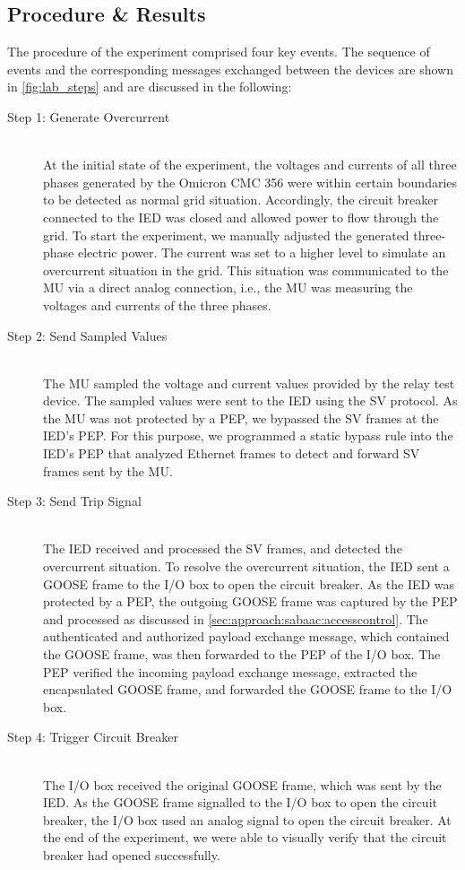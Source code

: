 \subsection{Procedure \& Results}
\label{sec:evaluation:compatibility:procedure}
The procedure of the experiment comprised four key events.
The sequence of events and the corresponding messages exchanged between the devices are shown in \autoref{fig:lab_steps} and are discussed in the following:
\begin{description}
    \item[Step 1: Generate Overcurrent]~\\
    At the initial state of the experiment, the voltages and currents of all three phases generated by the Omicron CMC 356 were within certain boundaries to be detected as normal grid situation.
    Accordingly, the circuit breaker connected to the IED was closed and allowed power to flow through the grid.
    To start the experiment, we manually adjusted the generated three-phase electric power.
    The current was set to a higher level to simulate an overcurrent situation in the grid.
    This situation was communicated to the MU via a direct analog connection, i.e., the MU was measuring the voltages and currents of the three phases.

    \item[Step 2: Send Sampled Values]~\\
    The MU sampled the voltage and current values provided by the relay test device.
    The sampled values were sent to the IED using the SV protocol.
    As the MU was not protected by a PEP, we bypassed the SV frames at the IED's PEP.
    For this purpose, we programmed a static bypass rule into the IED's PEP that analyzed Ethernet frames to detect and forward SV frames sent by the MU.

    \item[Step 3: Send Trip Signal]~\\
    The IED received and processed the SV frames, and detected the overcurrent situation.
    To resolve the overcurrent situation, the IED sent a GOOSE frame to the I/O box to open the circuit breaker.
    As the IED was protected by a PEP, the outgoing GOOSE frame was captured by the PEP and processed as discussed in \autoref{sec:approach:sabaac:accesscontrol}.
    The authenticated and authorized payload exchange message, which contained the GOOSE frame, was then forwarded to the PEP of the I/O box.
    The PEP verified the incoming payload exchange message, extracted the encapsulated GOOSE frame, and forwarded the GOOSE frame to the I/O box.

    \item[Step 4: Trigger Circuit Breaker]~\\
    The I/O box received the original GOOSE frame, which was sent by the IED.
    As the GOOSE frame signalled to the I/O box to open the circuit breaker, the I/O box used an analog signal to open the circuit breaker.
    At the end of the experiment, we were able to visually verify that the circuit breaker had opened successfully.
\end{description}
